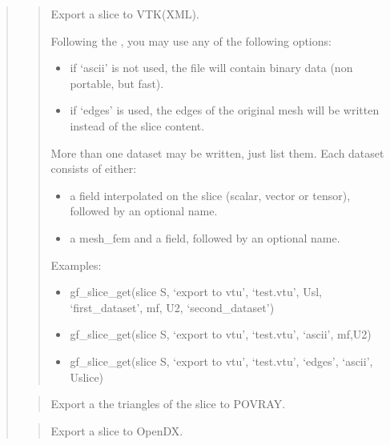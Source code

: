 \documentclass[a4paper,11pt,english]{sphinxmanual}
\begin{document}
\begin{quote}
\begin{quote}
Export a slice to VTK(XML).

Following the , you may use any of the following options:
\begin{itemize}
\item {} 
if ‘ascii’ is not used, the file will contain binary data
(non portable, but fast).

\item {} 
if ‘edges’ is used, the edges of the original mesh will be
written instead of the slice content.

\end{itemize}

More than one dataset may be written, just list them. Each dataset
consists of either:
\begin{itemize}
\item {} 
a field interpolated on the slice (scalar, vector or tensor),
followed by an optional name.

\item {} 
a mesh\_fem and a field, followed by an optional name.

\end{itemize}

Examples:
\begin{itemize}
\item {} 
gf\_slice\_get(slice S, ‘export to vtu’, ‘test.vtu’, Usl, ‘first\_dataset’, mf,
U2, ‘second\_dataset’)

\item {} 
gf\_slice\_get(slice S, ‘export to vtu’, ‘test.vtu’, ‘ascii’, mf,U2)

\item {} 
gf\_slice\_get(slice S, ‘export to vtu’, ‘test.vtu’, ‘edges’, ‘ascii’, Uslice)

\end{itemize}
\end{quote}

\begin{quote}

Export a the triangles of the slice to POV\sphinxhyphen{}RAY.
\end{quote}

\begin{quote}

Export a slice to OpenDX.


\end{quote}
\end{quote}
\end{document}
